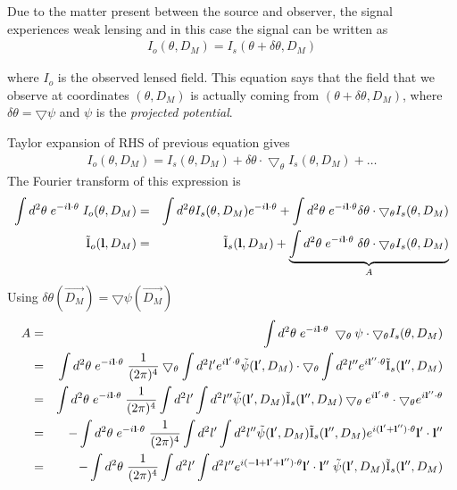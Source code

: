 \documentclass[12pt]{article}
\newcommand{\beqa}{\begin{eqnarray}}
\newcommand{\eeqa}{\end{eqnarray}}
\def\l{{\bf l}}
\def\iul{{\rm I}}
\def\il{{\tilde{\rm I}}}
\def\dtheta{\delta \theta}
\numberwithin{equation}{section}
\begin{document}
Due to the matter present between the source and observer, the signal experiences weak lensing and in this case the signal can be written as
\beqa
I_o(\theta,D_M) = I_s(\theta + \delta\theta, D_M )
\eeqa

where $I_o$ is the observed lensed field. This equation says that the field that we observe at coordinates $(\theta,D_M)$ is actually coming from $(\theta + \delta\theta, D_M)$, where $\delta\theta = \bigtriangledown\psi$ and $\psi$ is the \textit{projected potential}. 

Taylor expansion of RHS of previous equation gives
\beqa
I_o(\theta,D_M) = I_s(\theta,D_M) + \delta\theta \cdot \bigtriangledown_\theta I_s(\theta,D_M) + \ldots
\eeqa
The Fourier transform of this expression is
\begin{eqnarray}
\int d^2 \theta \; e^{-i \l \cdot \theta} \; I_o(\theta,D_M) &=& \int d^2 \theta I_s(\theta,D_M) e^{-i \l \cdot \theta} + \int d^2 \theta \; e^{-i\l \cdot \theta} \delta\theta \cdot \bigtriangledown_\theta I_s(\theta,D_M)\nonumber\\
\il_o(\l,D_M) &=& \il_s(\l,D_M) + \underbrace{\int d^2 \theta \; e^{-i\l \cdot \theta} \; \delta\theta \cdot \bigtriangledown_\theta I_s(\theta,D_M)}_{A}
\end{eqnarray}
Using $\dtheta(\vec{D_M})=\bigtriangledown \psi(\vec{D_M})$
\begin{eqnarray}
A &= & \int d^2 \theta \; e^{-i\l \cdot \theta} \; \bigtriangledown_\theta \psi \cdot \bigtriangledown_\theta I_s(\theta,D_M) \\
&= & \int d^2 \theta \; e^{-i\l \cdot \theta} \; \frac{1}{(2\pi)^4}  \bigtriangledown_\theta \int d^2 l'  e^{i\l' \cdot \theta} \tilde{\psi}(\l', D_M) \cdot \bigtriangledown_\theta \int d^2 l''  e^{i\l'' \cdot \theta} \il_s(\l'',D_M)  \\
&= & \int d^2 \theta \; e^{-i\l \cdot \theta} \; \frac{1}{(2\pi)^4}  \int d^2 l' \int d^2 l''  \tilde{\psi}(\l', D_M) \il_s(\l'',D_M) \bigtriangledown_\theta e^{i\l' \cdot \theta}  \cdot  \bigtriangledown_\theta  e^{i\l'' \cdot \theta}   \\
&= & - \int d^2 \theta \; e^{-i\l \cdot \theta} \;  \frac{1}{(2\pi)^4}  \int d^2 l' \int d^2 l''  \tilde{\psi}(\l', D_M) \il_s(\l'',D_M) e^{i(\l' + \l'') \cdot \theta} \l' \cdot \l''\\
&= & -\int d^2 \theta \; \frac{1}{(2\pi)^4}  \int d^2 l' \int d^2 l''  e^{i(-\l + \l' + \l'') \cdot \theta} \l' \cdot \l'' \; \tilde{\psi}(\l', D_M) \il_s(\l'',D_M)
\end{eqnarray}
\end{document}
